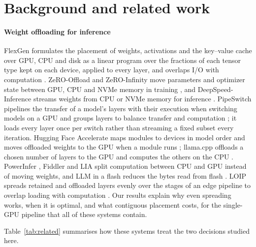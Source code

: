 \documentclass[final,5p,times,twocolumn]{elsarticle}
\theoremstyle{definition}
\begin{document}
\section{Background and related work}
\label{sec:related}

\paragraph{Weight offloading for inference}
FlexGen formulates the placement of weights, activations and the key--value cache over GPU, CPU and disk as a linear program over the fractions of each tensor type kept on each device, applied to every layer, and overlaps I/O with computation \cite{sheng2023flexgen}. ZeRO-Offload and ZeRO-Infinity move parameters and optimizer state between GPU, CPU and NVMe memory in training \cite{ren2021zerooffload,rajbhandari2021infinity}, and DeepSpeed-Inference streams weights from CPU or NVMe memory for inference \cite{aminabadi2022deepspeedinference}. PipeSwitch pipelines the transfer of a model's layers with their execution when switching models on a GPU and groups layers to balance transfer and computation \cite{bai2020pipeswitch}; it loads every layer once per switch rather than streaming a fixed subset every iteration. Hugging Face Accelerate maps modules to devices in model order and moves offloaded weights to the GPU when a module runs \cite{hf2024accelerate}; llama.cpp offloads a chosen number of layers to the GPU and computes the others on the CPU \cite{gerganov2023llamacpp}. PowerInfer \cite{song2024powerinfer}, Fiddler \cite{kamahori2025fiddler} and LIA \cite{kim2025lia} split computation between CPU and GPU instead of moving weights, and LLM in a flash reduces the bytes read from flash \cite{alizadeh2024flash}. LOIP spreads retained and offloaded layers evenly over the stages of an edge pipeline to overlap loading with computation \cite{sun2025loip}. Our results explain why even spreading works, when it is optimal, and what contiguous placement costs, for the single-GPU pipeline that all of these systems contain.

Table~\ref{tab:related} summarises how these systems treat the two decisions studied here.
\end{document}
